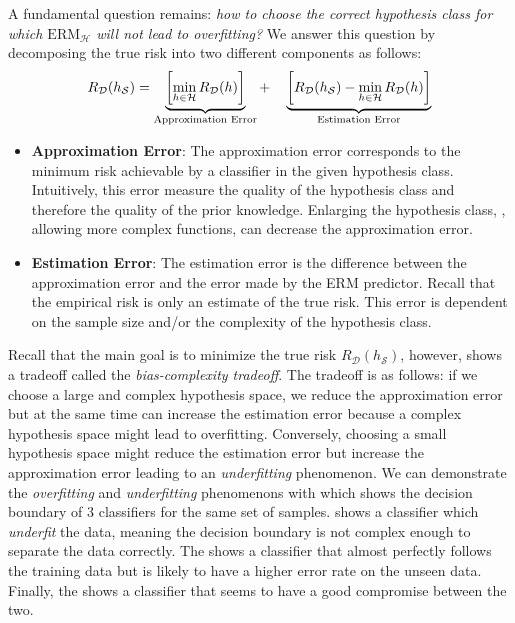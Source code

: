 A fundamental question remains: \emph{how to choose the correct hypothesis class for which $\text{ERM}_\mathcal{H}$ will not lead to overfitting?} 
We answer this question by decomposing the true risk into two different components as follows: 
\begin{equation}
  R_\mathcal{D} (h_\mathcal{S}) = 
  \underbrace{\left[ \min_{h \in \mathcal{H}} R_\mathcal{D}(h) \right]}_{\text{\scriptsize Approximation Error}} + \quad 
  \underbrace{\left[ R_\mathcal{D}(h_\mathcal{S}) - \min_{h \in \mathcal{H}} R_\mathcal{D}(h) \right]}_{\text{\scriptsize Estimation Error}} 
  \label{equation:ch2-bias_complexity_tradeoff}
\end{equation}
\begin{itemize}
  \item \textbf{Approximation Error}: The approximation error corresponds to the minimum risk achievable by a classifier in the given hypothesis class.
  Intuitively, this error measure the quality of the hypothesis class and therefore the quality of the prior knowledge.
  Enlarging the hypothesis class, \ie, allowing more complex functions, can decrease the approximation error.
  \item \textbf{Estimation Error}: The estimation error is the difference between the approximation error and the error made by the ERM predictor.
  Recall that the empirical risk is only an estimate of the true risk.
  This error is dependent on the sample size and/or the complexity of the hypothesis class. 
\end{itemize}
Recall that the main goal is to minimize the true risk $R_\mathcal{D} (h_\mathcal{S})$, however,  shows a tradeoff called the \emph{bias-complexity tradeoff}.
The tradeoff is as follows: if we choose a large and complex hypothesis space, we reduce the approximation error but at the same time can increase the estimation error because a complex hypothesis space might lead to overfitting.
Conversely, choosing a small hypothesis space might reduce the estimation error but increase the approximation error leading to an \emph{underfitting} phenomenon.
We can demonstrate the \emph{overfitting} and \emph{underfitting} phenomenons with  which shows the decision boundary of 3 classifiers for the same set of samples.
 shows a classifier which \emph{underfit} the data, meaning the decision boundary is not complex enough to separate the data correctly.
The  shows a classifier that almost perfectly follows the training data but is likely to have a higher error rate on the unseen data.
Finally, the  shows a classifier that seems to have a good compromise between the two.

